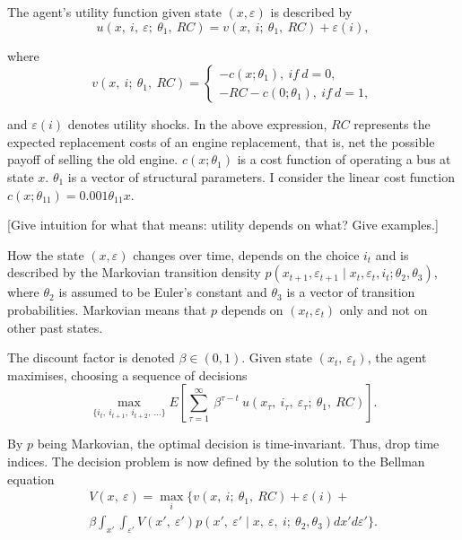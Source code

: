 The agent’s utility function given state $(x, \varepsilon)$ is described by
\begin{equation}
u(x,\ i,\ \varepsilon;\ \theta_1,\ RC)=v(x,\ i;\ \theta_1,\ RC)+\varepsilon(i),
\end{equation}

where
\begin{equation*}
v(x,\ i;\ \theta_1,\ RC)=
\begin{cases}
-c(x; \theta_1),\ if\ d=0,\\
-RC-c(0;\theta_1),\ if\ d=1,
\end{cases}
\end{equation*}

\noindent and $\varepsilon(i)$ denotes utility shocks. In the above expression, $RC$ represents the expected replacement costs of an engine replacement, that is, net the possible payoff of selling the old engine. $c(x; \theta_1)$ is a cost function of operating a bus at state $x$. $\theta_1$ is a vector of structural parameters. I consider the linear cost function $c(x; \theta_{11}) = 0.001 \theta_{11} x$.

[Give intuition for what that means: utility depends on what? Give examples.]

How the state $(x, \varepsilon)$ changes over time, depends on the choice $i_t$ and is described by the Markovian transition density $p(x_{t+1}, \varepsilon_{t+1} \mid x_t, \varepsilon_t, i_t; \theta_2, \theta_3)$, where $\theta_2$ is assumed to be Euler’s constant and $\theta_3$ is a vector of transition probabilities. Markovian means that $p$ depends on $ (x_t, \varepsilon_t) $ only and not on other past states.

The discount factor is denoted $\beta \in (0,1) $. Given state $ (x_t,\ \varepsilon_t) $, the agent maximises, choosing a sequence of decisions
\begin{equation}
\max_{\{i_t,\ i_{t+1},\ i_{t+2},\ ...\}} E \left[\sum_{\tau=1}^\infty\ \beta^{\tau-t}\ u(x_{\tau},\ i_{\tau},\ \varepsilon_{\tau};\ \theta_1,\ RC) \right].
\end{equation}

By $p$ being Markovian, the optimal decision is time-invariant. Thus, drop time indices. The decision problem is now defined by the solution to the Bellman equation
\begin{multline}
V(x,\ \varepsilon)=\max_i \{ v(x,\ i;\ \theta_1,\ RC)+\varepsilon(i) + \\
\beta \int_{x'} \int_{\varepsilon'} V(x',\ \varepsilon')p(x',\ \varepsilon' \mid x,\ \varepsilon,\ i;\ \theta_2, \theta_3)dx' d \varepsilon' \}.
\end{multline}

